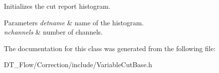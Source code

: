 Initializes the cut report histogram. 


\begin{DoxyParams}{Parameters}
{\em detname} & name of the histogram. \\
\hline
{\em nchannels} & number of channels. \\
\hline
\end{DoxyParams}


The documentation for this class was generated from the following file\+:\begin{DoxyCompactItemize}
\item 
D\+T\+\_\+\+Flow/\+Correction/include/Variable\+Cut\+Base.\+h\end{DoxyCompactItemize}
